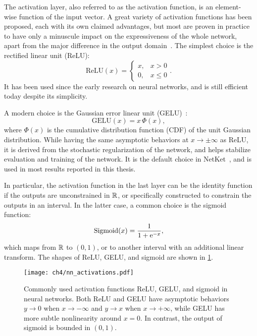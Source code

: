 The activation layer, also referred to as the activation function, is an element-wise function of the input vector. A great variety of activation functions has been proposed, each with its own claimed advantages, but most are proven in practice to have only a minuscule impact on the expressiveness of the whole network, apart from the major difference in the output domain~\cite{kunc2024three}. The simplest choice is the rectified linear unit (ReLU):
\begin{equation}
\text{ReLU}(x) = \begin{cases}
x, & x > 0 \\
0, & x \le 0
\end{cases}.
\end{equation}
It has been used since the early research on neural networks, and is still efficient today despite its simplicity.

A modern choice is the Gaussian error linear unit (GELU)~\cite{hendrycks2016gaussian}:
\begin{equation}
\text{GELU}(x) = x\,\Phi(x),
\end{equation}
where $\Phi(x)$ is the cumulative distribution function (CDF) of the unit Gaussian distribution. While having the same asymptotic behaviors at $x \to \pm \infty$ as ReLU, it is derived from the stochastic regularization of the network, and helps stabilize evaluation and training of the network. It is the default choice in NetKet~\cite{carleo2019netket}, and is used in most results reported in this thesis.

In particular, the activation function in the last layer can be the identity function if the outputs are unconstrained in $\mathbb{R}$, or specifically constructed to constrain the outputs in an interval. In the latter case, a common choice is the sigmoid function:
\begin{equation}
\text{Sigmoid}(x) = \frac{1}{1 + \mathrm{e}^{-x}},
\label{eq:sigmoid}
\end{equation}
which maps from $\mathbb{R}$ to $(0, 1)$, or to another interval with an additional linear transform. The shapes of ReLU, GELU, and sigmoid are shown in \cref{fig:activations}.

\begin{figure}[htb]
\centering
\texttt{[image: ch4/nn\_activations.pdf]}
\caption[Commonly used activation functions in neural networks]{
Commonly used activation functions ReLU, GELU, and sigmoid in neural networks.
Both ReLU and GELU have asymptotic behaviors $y \to 0$ when $x \to -\infty$ and $y \to x$ when $x \to +\infty$, while GELU has more subtle nonlinearity around $x = 0$.
In contrast, the output of sigmoid is bounded in $(0, 1)$.
}
\label{fig:activations}
\end{figure}

